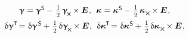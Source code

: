\begin{otherlanguage}{russian}
\nopagebreak\vspace{-0.1em}\begin{equation*}
\begin{array}{c}
\distortiontensor = \distortiontensor^{\mathsf{S}} \hspace{-0.1ex} - \hspace{.25ex} \smalldisplaystyleonehalf \hspace{.32ex} \distortiontensor_{\hspace{-0.25ex}\Xcompanion} \hspace{-0.1ex} \times \UnitDyad
\hspace{.1ex} ,
\:\:
%
\wrynesstensor \hspace{.1ex} = \wrynesstensor^{\hspace{.12ex}\mathsf{S}} \hspace{-0.1ex} - \hspace{.25ex} \smalldisplaystyleonehalf \hspace{.32ex} \wrynesstensor_{\hspace{.15ex}\Xcompanion} \hspace{-0.1ex} \times \UnitDyad
\hspace{.1ex} ,
\\[.6em]
%
\variation{\distortiontensor}^{\T} \hspace{-0.33ex} = \hspace{.1ex} \variation{\distortiontensor}^{\hspace{.2ex}\mathsf{S}} \hspace{-0.1ex} + \hspace{.2ex} \smalldisplaystyleonehalf \hspace{.32ex} \variation{\distortiontensor}_{\hspace{-0.25ex}\Xcompanion} \hspace{-0.1ex} \times \UnitDyad
\hspace{.1ex} ,
\:\:
%
\variation{\wrynesstensor}^{\T} \hspace{-0.33ex} = \hspace{.1ex} \variation{\wrynesstensor}^{\hspace{.12ex}\mathsf{S}} \hspace{-0.1ex} + \hspace{.2ex} \smalldisplaystyleonehalf \hspace{.32ex} \variation{\wrynesstensor}_{\hspace{.15ex}\Xcompanion} \hspace{-0.1ex} \times \UnitDyad
\hspace{.1ex} ,
\\[.6em]

\end{array}
\end{equation*}
\end{otherlanguage}
